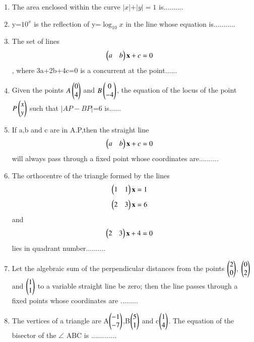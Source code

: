 \begin{enumerate}[label=\arabic*]

    \item The area enclosed within the curve $\vert x \vert + \vert y \vert = 1 $ is..........
    \item y=$10^x$ is the reflection of y=$\log_10x$ in the line whose equation is...........

    \item The set of lines \begin{align} 
    \begin{pmatrix}a & b\end{pmatrix}\mathbf{x} + c &= 0
    \end{align}, where 3a+2b+4c=0 is a concurrent at 
    the point......
    \item Given the points $A\begin{pmatrix}0 \\ 4\end{pmatrix}$ and $B\begin{pmatrix}0 \\ -4\end{pmatrix}$, the equation of the locus of the point $P\begin{pmatrix}x \\ y\end{pmatrix}$ such that $\vert AP-BP \vert$=6  is......
    \item If a,b and c are in A.P,then the straight line \begin{align} 
    \begin{pmatrix}a & b\end{pmatrix}\mathbf{x} + c &= 0
    \end{align}will always pass through a fixed point whose coordinates are.......... 
    \item The orthocentre of the triangle formed by the lines \begin{align} 
    \begin{pmatrix}1 & 1\end{pmatrix}\mathbf{x}  &= 1
    \end{align}\begin{align} 
    \begin{pmatrix}2 & 3\end{pmatrix}\mathbf{x}  &= 6
    \end{align} and \begin{align} 
    \begin{pmatrix}2 & 3\end{pmatrix}\mathbf{x} + 4 &= 0
    \end{align} lies in quadrant number..........
    \item Let the algebraic sum of the perpendicular distances from the points $\begin{pmatrix}2 \\ 0\end{pmatrix}$,  $\begin{pmatrix}0 \\ 2\end{pmatrix}$ and $\begin{pmatrix}1 \\ 1\end{pmatrix}$ to a variable straight line be zero; then the line passes through a fixed points whose coordinates are .........\\
    \item The vertices of a triangle are A$\begin{pmatrix}-1 \\ -7\end{pmatrix}$,B$\begin{pmatrix}5 \\ 1\end{pmatrix}$ and c$\begin{pmatrix}1 \\ 4\end{pmatrix}$. The equation of the bisector of the $\angle$ ABC is .............\\
\end{enumerate}

